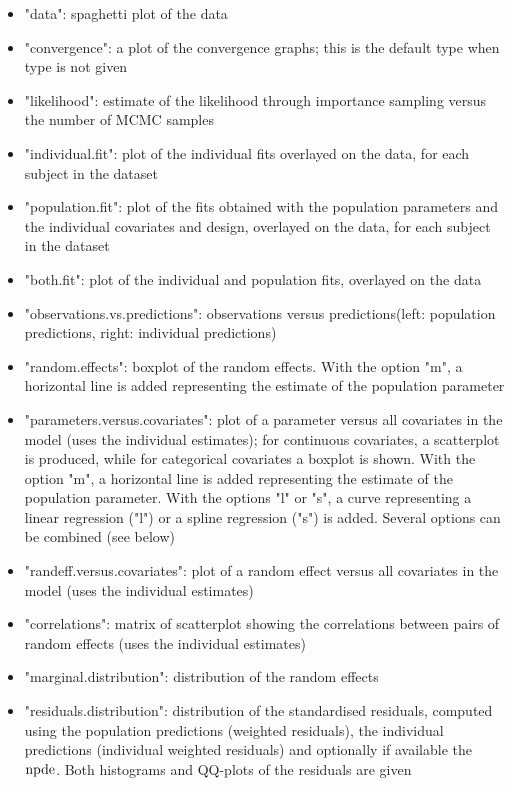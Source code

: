 \begin{itemize}
\item "data": spaghetti plot of the data
\item "convergence": a plot of the convergence graphs; this is the default type when {\sf type} is not given
\item "likelihood": estimate of the likelihood through importance sampling versus the number of MCMC samples
\item "individual.fit": plot of the individual fits overlayed on the data, for each subject in the dataset
\item "population.fit": plot of the fits obtained with the population parameters and the individual covariates and design, overlayed on the data, for each subject in the dataset%
\item "both.fit": plot of the individual and population fits, overlayed on the data %
\item "observations.vs.predictions": observations versus predictions(left: population predictions, right: individual predictions)
\item "random.effects": boxplot of the random effects. With the option "m", a horizontal line is added representing the estimate of the population parameter
\item "parameters.versus.covariates": plot of a parameter versus all covariates in the model (uses the individual estimates); for continuous covariates, a scatterplot is produced, while for categorical covariates a boxplot is shown. With the option "m", a horizontal line is added representing the estimate of the population parameter. With the options "l" or "s", a curve representing a linear regression ("l") or a spline regression ("s") is added. Several options can be combined (see below) %
\item "randeff.versus.covariates": plot of a random effect versus all covariates in the model (uses the individual estimates) %
\item "correlations": matrix of scatterplot showing the correlations between pairs of random effects (uses the individual estimates)
\item "marginal.distribution": distribution of the random effects
\item "residuals.distribution": distribution of the standardised residuals, computed using the population predictions (weighted residuals), the individual predictions (individual weighted residuals) and optionally if available the ${\rm npde}$. Both histograms and QQ-plots of the residuals are given

\end{itemize}
